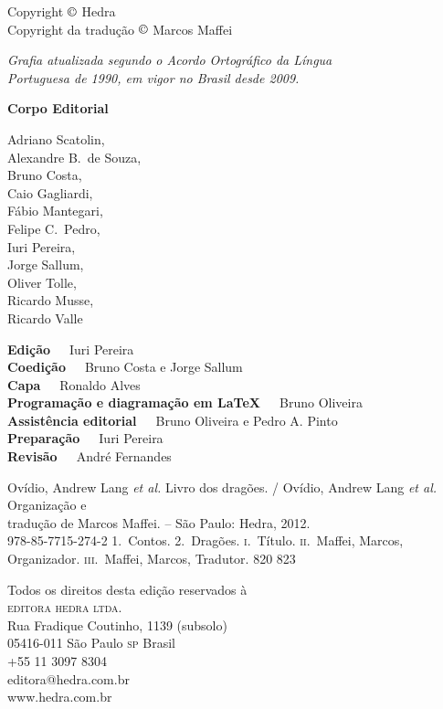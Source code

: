 
\begingroup
\parindent0mm\parskip0mm
\footnotesize
\thispagestyle{empty}

Copyright $\copyright$ Hedra \the\year\\
Copyright da tradução $\copyright$ Marcos Maffei\medskip

{\itshape
Grafia atualizada segundo o Acordo Ortográfico da Língua\\
Portuguesa de 1990, em vigor no Brasil desde 2009. 
}\medskip

\textbf{Corpo Editorial}

Adriano Scatolin,\\
Alexandre B.~de Souza,\\
Bruno Costa,\\
Caio Gagliardi,\\
Fábio Mantegari,\\
Felipe C.~Pedro,\\
Iuri Pereira,\\
Jorge Sallum,\\
Oliver Tolle,\\
Ricardo Musse,\\
Ricardo Valle\smallskip

\textbf{Edição}\ \ \ Iuri Pereira  \\
\textbf{Coedição}\ \ \ Bruno Costa e Jorge Sallum\\
\textbf{Capa}\ \ \  Ronaldo Alves\\
\textbf{Programação e diagramação em \LaTeX}\ \ \  Bruno Oliveira\\
\textbf{Assistência editorial}\ \ \  Bruno Oliveira e Pedro A. Pinto\\
\textbf{Preparação}\ \ \ Iuri Pereira\\
\textbf{Revisão}\ \ \ André Fernandes\medskip

{Ovídio, Andrew Lang \textit{et al.}}
{Livro dos dragões. / Ovídio, Andrew Lang \textit{et al.} Organização e\\
tradução de Marcos Maffei. -- São Paulo: Hedra, 2012.\\}
{978-85-7715-274-2}
{1.~Contos. 2.~Dragões. 
\textsc{i}.~Título. \textsc{ii}.~Maffei, Marcos, Organizador.
\textsc{iii}.~Maffei, Marcos, Tradutor.}
{820}
{823}\medskip

Todos os direitos desta edição reservados à\\
\textsc{editora hedra ltda.}\\
Rua Fradique Coutinho, 1139 (subsolo)\\
05416-011 São Paulo \textsc{sp} Brasil\\
+55 11 3097 8304\\
editora@hedra.com.br\\
www.hedra.com.br

\vfill\pagebreak 

\endgroup
